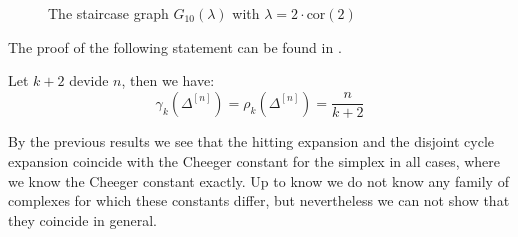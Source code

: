 \begin{expl}
\begin{figure}[ht]
  \caption{The staircase graph $G_{10}(\lambda)$ with $\lambda=2\cdot\text{cor}(2)$}
  \label{figure13:Figure 13}
\end{figure}

\end{expl}

The proof of the following statement can be found in \cite{6}.

\begin{thm}
Let \(k+2\) devide \(n\), then we have:
\[
\gamma_k(\Delta^{[n]})=\rho_k(\Delta^{[n]})=\frac{n}{k+2}
\]
\end{thm}

By the previous results we see that the hitting expansion and the disjoint cycle expansion coincide with the Cheeger constant for the simplex in all cases, where we know the Cheeger constant exactly. Up to know we do not know any family of complexes for which these constants differ, but nevertheless we can not show that they coincide in general.